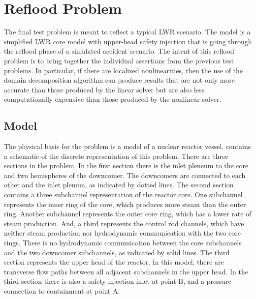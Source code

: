 \section{Reflood Problem}
\label{sect:refloodProblem}

The final test problem is meant to reflect a typical LWR scenario.
The model is a simplified LWR core model with upper-head safety injection that is going through the reflood phase of a simulated accident scenario.
The intent of this reflood problem is to bring together the individual assertions from the previous test problems.
In particular, if there are localized nonlinearities, then the use of the domain decomposition algorithm can produce results that are not only more accurate than those produced by the linear solver but are also less computationally expensive than those produced by the nonlinear solver.

\subsection{Model}
\label{sect:refloodModel}

The physical basis for the problem is a model of a nuclear reactor vessel.
 contains a schematic of the discrete representation of this problem.
There are three sections in the problem.
In the first section there is the inlet pleneum to the core and two hemispheres of the downcomer.
The downcomers are connected to each other and the inlet plenum, as indicated by dotted lines.
The second section contains a three subchannel representation of the reactor core.
One subchannel represents the inner ring of the core, which produces more steam than the outer ring.
Another subchannel represents the outer core ring, which has a lower rate of steam production.
And, a third represents the control rod channels, which have neither steam production nor hydrodynamic communication with the two core rings.
There is no hydrodynamic communication between the core subchannels and the two downcomer subchannels, as indicated by solid lines.
The third section represents the upper head of the reactor.
In this model, there are transverse flow paths between all adjacent subchannels in the upper head.
In the third section there is also a safety injection inlet at point B, and a pressure connection to containment at point A.

